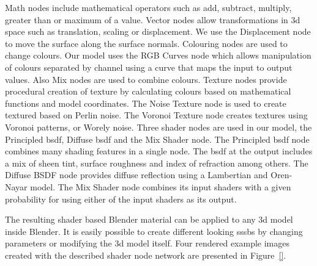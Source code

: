 Math nodes include mathematical operators such as add, subtract, multiply, greater than or maximum of a value. Vector nodes allow transformations in \gls{3d} space such as translation, scaling or displacement. We use the Displacement node to move the surface along the surface normals. Colouring nodes are used to change colours. Our model uses the RGB Curves node which allows manipulation of colours separated by channel using a curve that maps the input to output values. Also Mix nodes are used to combine colours. Texture nodes provide procedural creation of texture by calculating colours based on mathematical functions and model coordinates. The Noise Texture node is used to create textured based on Perlin noise. The Voronoi Texture node creates textures using Voronoi patterns, or Worely noise. Three shader nodes are used in our model, the Principled \gls{bsdf}, Diffuse \gls{bsdf} and the Mix Shader node. The Principled \gls{bsdf} node combines many shading features in a single node. The \gls{bsdf} at the output includes a mix of sheen tint, surface roughness and index of refraction among others. The Diffuse BSDF node provides diffuse reflection using a Lambertian and Oren-Nayar model. The Mix Shader node combines its input shaders with a given probability for using either of the input shaders as its output.

The resulting shader based Blender material can be applied to any \gls{3d} model inside Blender. It is easily possible to create different looking \glspl{sssb} by changing parameters or modifying the \gls{3d} model itself. Four rendered example images created with the described shader node network are presented in Figure~\ref{}.

